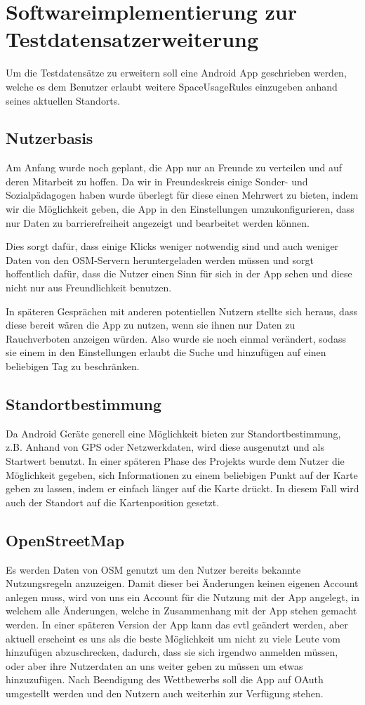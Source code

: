 \section{Softwareimplementierung zur Testdatensatzerweiterung}
Um die Testdatensätze zu erweitern soll eine Android App geschrieben werden, welche es dem
Benutzer erlaubt weitere SpaceUsageRules einzugeben anhand seines aktuellen Standorts.

\subsection{Nutzerbasis}
Am Anfang wurde noch geplant, die App nur an Freunde zu verteilen und auf deren Mitarbeit zu hoffen.
Da wir in Freundeskreis einige Sonder- und Sozialpädagogen haben wurde überlegt für diese einen Mehrwert zu bieten,
indem wir die Möglichkeit geben, die App in den Einstellungen umzukonfigurieren, dass nur Daten zu barrierefreiheit angezeigt und bearbeitet werden können.

Dies sorgt dafür, dass einige Klicks weniger notwendig sind und auch weniger Daten von den OSM-Servern heruntergeladen werden müssen
und sorgt hoffentlich dafür, dass die Nutzer einen Sinn für sich in der App sehen und diese nicht nur aus Freundlichkeit benutzen.

In späteren Gesprächen mit anderen potentiellen Nutzern stellte sich heraus, dass diese bereit wären die App zu nutzen,
wenn sie ihnen nur Daten zu Rauchverboten anzeigen würden.
Also wurde sie noch einmal verändert, sodass sie einem in den Einstellungen erlaubt die Suche und hinzufügen auf einen beliebigen Tag zu beschränken.

\subsection{Standortbestimmung}
Da Android Geräte generell eine Möglichkeit bieten zur Standortbestimmung, z.B. Anhand von GPS oder Netzwerkdaten,
wird diese ausgenutzt und als Startwert benutzt.
In einer späteren Phase des Projekts wurde dem Nutzer die Möglichkeit gegeben, sich Informationen zu einem beliebigen Punkt auf der Karte geben zu lassen,
indem er einfach länger auf die Karte drückt. In diesem Fall wird auch der Standort auf die Kartenposition gesetzt.

\subsection{OpenStreetMap}
Es werden Daten von OSM genutzt um den Nutzer bereits bekannte Nutzungsregeln anzuzeigen.
Damit dieser bei Änderungen keinen eigenen Account anlegen muss, wird von uns ein Account für die Nutzung mit der App angelegt,
in welchem alle Änderungen, welche in Zusammenhang mit der App stehen gemacht werden.
In einer späteren Version der App kann das evtl geändert werden, aber aktuell erscheint es uns als die beste Möglichkeit
um nicht zu viele Leute vom hinzufügen abzuschrecken, dadurch, dass sie sich irgendwo anmelden müssen,
oder aber ihre Nutzerdaten an uns weiter geben zu müssen um etwas hinzuzufügen.
Nach Beendigung des Wettbewerbs soll die App auf OAuth umgestellt werden und den Nutzern auch weiterhin zur Verfügung stehen.

